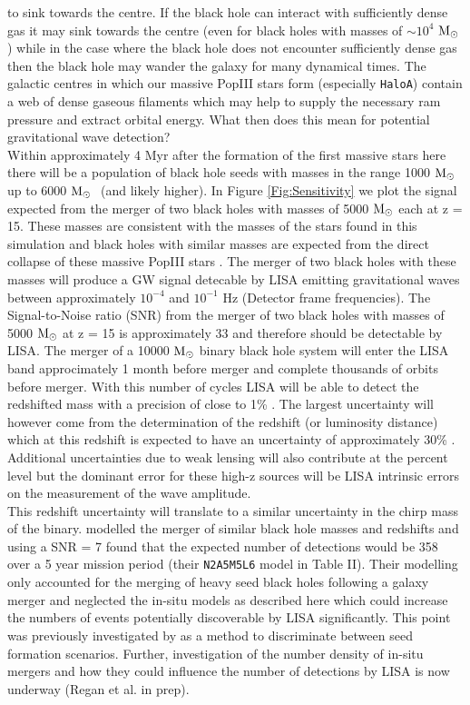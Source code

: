 \documentclass[graphics, twocolumn, usenatbib]{mn2e}
\newcommand{\msolar} {$\rm{M_{\odot}}~$}
\newcommand{\msolarc} {$\rm{M_{\odot}}$}
\newcommand{\hac} {\texttt{HaloA}}
\begin{document}
to sink towards the centre. If the black hole can interact with sufficiently dense gas it may
sink towards the centre (even for black holes with masses of $\sim 10^4$ \msolarc) while in
the case where the black hole does not encounter sufficiently dense gas then the black hole
may wander the galaxy for many dynamical times. The galactic centres in which our massive PopIII
stars form (especially \hac) contain a web of dense gaseous filaments which may help to supply
the necessary ram pressure and extract orbital energy. 
What then does this mean for potential gravitational wave detection?\\
\indent Within approximately 4 Myr after the formation of the first massive stars here there
will be a population of black hole seeds with masses in the range 1000 \msolar up to 6000 \msolar
(and likely higher). In Figure \ref{Fig:Sensitivity} we plot the signal expected from the
merger of two black holes with masses of 5000 \msolar each at z = 15. These masses
are consistent with the masses of the stars found in this simulation and black holes
with similar masses are expected from the direct collapse of these massive PopIII
stars \citep{Heger_2003}. The merger of two black holes with these masses will produce a
GW signal detecable by LISA \citep{Sesana_2016, Cornish_2020} emitting
gravitational waves between approximately $10^{-4}$ and $10^{-1}$ Hz (Detector frame frequencies). The
Signal-to-Noise ratio (SNR) from the merger of two black holes with masses of 5000 \msolar at z = 15
is approximately 33 and therefore should be detectable by LISA. The merger of a 10000 \msolar binary
black hole system will enter the LISA band approcimately 1 month before merger and complete
thousands of orbits before merger. With this number of cycles LISA will be able to detect
the redshifted mass with a precision of close to 1\% \citep{Sesana_2013}. The largest uncertainty
will however come from the determination of the redshift (or luminosity distance) which at this
redshift is expected to have an uncertainty of approximately 30\% \citep{Sesana_2013}. Additional
uncertainties due to weak lensing will also contribute at the percent level
\citep{Shapiro_2010, Petiteau_2011}
but the dominant error for these high-z sources will be LISA intrinsic errors on the measurement of
the wave amplitude. \\
\indent This redshift uncertainty will translate to a similar uncertainty in the chirp mass of the binary.
\cite{Klein_2016} modelled the merger of similar black hole masses and redshifts and using a
SNR = 7 found that the expected number of detections would be 358 over a 5 year mission period
(their \texttt{N2A5M5L6} model in Table II). Their modelling only accounted for the merging of
heavy seed black holes following a galaxy merger and
neglected the in-situ models as described here which could increase the numbers of events potentially
discoverable by LISA significantly. This point was previously investigated by
\cite{Hartwig_2018} as a method to discriminate between seed formation scenarios. Further,
investigation of the number density of in-situ mergers and how they could influence the number
of detections by LISA is now underway (Regan et al. in prep).
\end{document}
